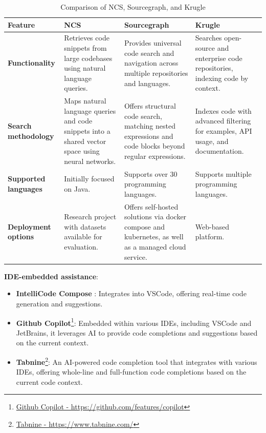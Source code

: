     \begin{table}[h!]
    \centering
    \begin{tabular}{p{3cm}p{4cm}p{4cm}p{4cm}}
    \hline
    \textbf{Feature} & \textbf{NCS} & \textbf{Sourcegraph} & \textbf{Krugle} \\ \hline
    
    \textbf{Functionality}
    & Retrieves code snippets from large codebases using natural language queries.
    & Provides universal code search and navigation across multiple repositories and languages.
    & Searches open-source and enterprise code repositories, indexing code by context. \\ \hline
    
    \textbf{Search methodology}
    & Maps natural language queries and code snippets into a shared vector space using neural networks.
    & Offers structural code search, matching nested expressions and code blocks beyond regular expressions.
    & Indexes code with advanced filtering for examples, API usage, and documentation. \\ \hline
    
    \textbf{Supported languages}
    & Initially focused on Java.
    & Supports over 30 programming languages.
    & Supports multiple programming languages. \\ \hline
    
    \textbf{Deployment options}
    & Research project with datasets available for evaluation.
    & Offers self-hosted solutions via docker compose and kubernetes, as well as a managed cloud service.
    & Web-based platform. \\ \hline
    
    \end{tabular}
    \caption{Comparison of NCS, Sourcegraph, and Krugle}
    \end{table}

\textbf{IDE-embedded assistance}:
    \begin{itemize}
        \item \textbf{IntelliCode Compose} \cite{svyatkovskiy2020}: Integrates into VSCode, offering real-time code generation and suggestions.
        \item \textbf{Github Copilot}\footnote{\href{https://github.com/features/copilot}{Github Copilot - https://github.com/features/copilot}}: Embedded within various IDEs, including VSCode and JetBrains, it leverages AI to provide code completions and suggestions based on the current context.
        \item \textbf{Tabnine}\footnote{\href{https://www.tabnine.com/}{Tabnine - https://www.tabnine.com/}}: An AI-powered code completion tool that integrates with various IDEs, offering whole-line and full-function code completions based on the current code context.
    \end{itemize}

